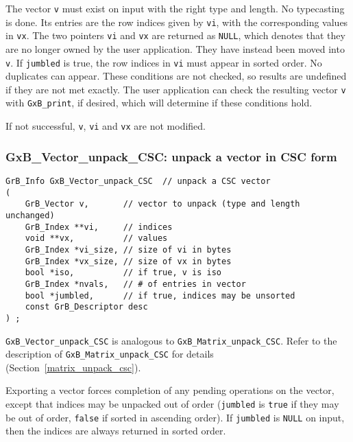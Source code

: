 \documentclass[12pt]{article}
\begin{document}
The vector \verb'v' must
exist on input with the right type and length.  No typecasting is done.
Its entries are
the row indices given by \verb'vi', with the corresponding values in \verb'vx'.
The two pointers \verb'vi' and \verb'vx' are returned as \verb'NULL', which
denotes that they are no longer owned by the user application.  They have
instead been moved into \verb'v'.  If \verb'jumbled'
is true, the row indices in \verb'vi' must appear in sorted order.  No
duplicates can appear.  These conditions are not checked, so results are
undefined if they are not met exactly.  The user application can check the
resulting vector \verb'v' with \verb'GxB_print', if desired, which will
determine if these conditions hold.

If not successful, \verb'v', \verb'vi' and
\verb'vx' are not modified.

\newpage
\subsubsection{{\sf GxB\_Vector\_unpack\_CSC:} unpack a vector in CSC form}
\label{vector_unpack_csc}

\begin{mdframed}[userdefinedwidth=6in]
{\footnotesize
\begin{verbatim}
GrB_Info GxB_Vector_unpack_CSC  // unpack a CSC vector
(
    GrB_Vector v,       // vector to unpack (type and length unchanged)
    GrB_Index **vi,     // indices
    void **vx,          // values
    GrB_Index *vi_size, // size of vi in bytes
    GrB_Index *vx_size, // size of vx in bytes
    bool *iso,          // if true, v is iso
    GrB_Index *nvals,   // # of entries in vector
    bool *jumbled,      // if true, indices may be unsorted
    const GrB_Descriptor desc
) ;
\end{verbatim}
} \end{mdframed}

\verb'GxB_Vector_unpack_CSC' is analogous to \verb'GxB_Matrix_unpack_CSC'.
Refer to the description of \verb'GxB_Matrix_unpack_CSC' for details
(Section~\ref{matrix_unpack_csc}).

Exporting a vector forces completion of any pending operations on the vector,
except that indices may be unpacked out of order (\verb'jumbled' is \verb'true'
if they may be out of order, \verb'false' if sorted in ascending order).  If
\verb'jumbled' is \verb'NULL' on input, then the indices are always returned in
sorted order.
\end{document}
